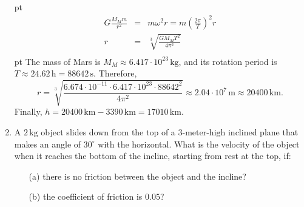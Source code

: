 \documentclass[a4paper,12pt]{letter}
\begin{document}
\begin{enumerate}
\begin{center}
\end{center}

 pt
\begin{eqnarray*}
G \frac{M_{M} m}{r^2} &=& m \omega^2 r = m \left(\frac{2\pi}{T}\right)^2 r  \\
  r &=& \sqrt[3]{\frac{G M_M T^2}{4\pi^2}}  \\
\end{eqnarray*}
 pt
The mass of Mars is $M_M \approx 6.417 \cdot 10^{23}\,\text{kg}$, and its rotation period is $T \approx 24.62\,\text{h} = 88642\,\text{s}$. Therefore, $$r = \sqrt[3]{\frac{6.674 \cdot 10^{-11} \cdot 6.417 \cdot 10^{23} \cdot 88642^2}{4\pi^2}} \approx 2.04 \cdot 10^7\,\text{m} \approx 20400\,\text{km}.$$ Finally, $h=20400\,\text{km}-3390\,\text{km}=17010\,\text{km}$.


\pagebreak
\item A $2\,\text{kg}$ object slides down from the top of a $3\text{-meter-high}$ inclined plane that makes an angle of $30^\circ$ with the horizontal. What is the velocity of the object when it reaches the bottom of the incline, starting from rest at the top, if:
\begin{enumerate}
    \item[(a)] there is no friction between the object and the incline?
    \item[(b)] the coefficient of friction is $0.05$?
\end{enumerate}

\smallskip

\begin{center}
\end{center}
\end{enumerate}
\end{document}
